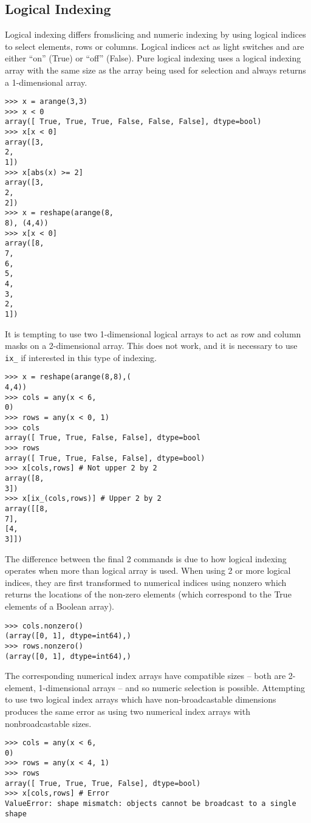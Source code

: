 \documentclass[KSmain.tex]{subfiles}
\begin{document}
\subsection{Logical Indexing}
Logical indexing differs fromslicing and numeric indexing by using logical indices to select elements, rows
or columns. Logical indices act as light switches and are either “on” (True) or “off” (False). Pure logical
indexing uses a logical indexing array with the same size as the array being used for selection and always
returns a 1-dimensional array.
\begin{framed}
\begin{verbatim}
>>> x = arange(3,3)
>>> x < 0
array([ True, True, True, False, False, False], dtype=bool)
>>> x[x < 0]
array([3,
2,
1])
>>> x[abs(x) >= 2]
array([3,
2,
2])
>>> x = reshape(arange(8,
8), (4,4))
>>> x[x < 0]
array([8,
7,
6,
5,
4,
3,
2,
1])
\end{verbatim}
\end{framed}
It is tempting to use two 1-dimensional logical arrays to act as row and column masks on a 2-dimensional
array. This does not work, and it is necessary to use \texttt{ix\_} if interested in this type of indexing.
\begin{framed}
\begin{verbatim}
>>> x = reshape(arange(8,8),(
4,4))
>>> cols = any(x < 6,
0)
>>> rows = any(x < 0, 1)
>>> cols
array([ True, True, False, False], dtype=bool
>>> rows
array([ True, True, False, False], dtype=bool)
>>> x[cols,rows] # Not upper 2 by 2
array([8,
3])
>>> x[ix_(cols,rows)] # Upper 2 by 2
array([[8,
7],
[4,
3]])
\end{verbatim}
\end{framed}
The difference between the final 2 commands is due to how logical indexing operates when more than
logical array is used. When using 2 or more logical indices, they are first transformed to numerical indices
using nonzero which returns the locations of the non-zero elements (which correspond to the True
elements of a Boolean array).
\begin{framed}
\begin{verbatim}
>>> cols.nonzero()
(array([0, 1], dtype=int64),)
>>> rows.nonzero()
(array([0, 1], dtype=int64),)
\end{verbatim}
\end{framed}
The corresponding numerical index arrays have compatible sizes – both are 2-element, 1-dimensional
arrays – and so numeric selection is possible. Attempting to use two logical index arrays which have
non-broadcastable dimensions produces the same error as using two numerical index arrays with nonbroadcastable
sizes.
\begin{framed}
\begin{verbatim}
>>> cols = any(x < 6,
0)
>>> rows = any(x < 4, 1)
>>> rows
array([ True, True, True, False], dtype=bool)
>>> x[cols,rows] # Error
ValueError: shape mismatch: objects cannot be broadcast to a single shape
\end{verbatim}
\end{framed}
\end{document}
